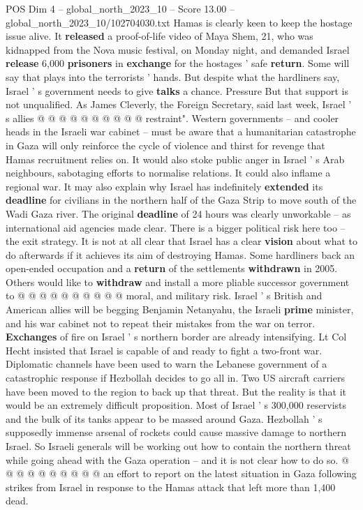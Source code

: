 \begin{textsample}{POS Dim 4 – global\_north\_2023\_10 – Score 13.00 – global\_north\_2023\_10/102704030.txt}
Hamas is clearly keen to keep the hostage issue alive.
It \textbf{released} a proof-of-life video of Maya Shem, 21, who was kidnapped from the Nova music festival, on Monday night, and demanded Israel \textbf{release} 6,000 \textbf{prisoners} in \textbf{exchange} for the hostages ' safe \textbf{return}.
Some will say that plays into the terrorists ' hands.
But despite what the hardliners say, Israel ' s government needs to give \textbf{talks} a chance.
Pressure But that support is not unqualified.
As James Cleverly, the Foreign Secretary, said last week, Israel ' s allies @ @ @ @ @ @ @ @ @ @ restraint".
Western governments -- and cooler heads in the Israeli war cabinet -- must be aware that a humanitarian catastrophe in Gaza will only reinforce the cycle of violence and thirst for revenge that Hamas recruitment relies on.
It would also stoke public anger in Israel ' s Arab neighbours, sabotaging efforts to normalise relations.
It could also inflame a regional war.
It may also explain why Israel has indefinitely \textbf{extended} its \textbf{deadline} for civilians in the northern half of the Gaza Strip to move south of the Wadi Gaza river.
The original \textbf{deadline} of 24 hours was clearly unworkable -- as international aid agencies made clear.
There is a bigger political risk here too -- the exit strategy.
It is not at all clear that Israel has a clear \textbf{vision} about what to do afterwards if it achieves its aim of destroying Hamas.
Some hardliners back an open-ended occupation and a \textbf{return} of the settlements \textbf{withdrawn} in 2005.
Others would like to \textbf{withdraw} and install a more pliable successor government to @ @ @ @ @ @ @ @ @ @ moral, and military risk.
Israel ' s British and American allies will be begging Benjamin Netanyahu, the Israeli \textbf{prime} minister, and his war cabinet not to repeat their mistakes from the war on terror. \textbf{Exchanges} of fire on Israel ' s northern border are already intensifying.
Lt Col Hecht insisted that Israel is capable of and ready to fight a two-front war.
Diplomatic channels have been used to warn the Lebanese government of a catastrophic response if Hezbollah decides to go all in.
Two US aircraft carriers have been moved to the region to back up that threat.
But the reality is that it would be an extremely difficult proposition.
Most of Israel ' s 300,000 reservists and the bulk of its tanks appear to be massed around Gaza.
Hezbollah ' s supposedly immense arsenal of rockets could cause massive damage to northern Israel.
So Israeli generals will be working out how to contain the northern threat while going ahead with the Gaza operation -- and it is not clear how to do so. @ @ @ @ @ @ @ @ @ @ an effort to report on the latest situation in Gaza following strikes from Israel in response to the Hamas attack that left more than 1,400 dead.

\end{textsample}

